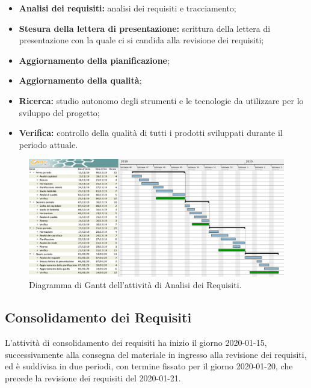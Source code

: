 				\begin{itemize}
					\item \textbf{Analisi dei requisiti:} analisi dei requisiti e tracciamento;
					\item \textbf{Stesura della lettera di presentazione:} scrittura della lettera di presentazione con la quale ci si candida alla revisione dei requisiti;
					\item \textbf{Aggiornamento della pianificazione};
					\item \textbf{Aggiornamento della qualità};
					\item \textbf{Ricerca:} studio autonomo degli strumenti e le tecnologie da utilizzare per lo sviluppo del progetto;
					\item \textbf{Verifica:} controllo della qualità di tutti i prodotti sviluppati durante il periodo attuale.
				\end{itemize}
        
        \begin{landscape}

          \begin{figure}[H]
            \centering
            \includegraphics[width=\linewidth]{images/ganttAnalisi}
            \caption{Diagramma di Gantt dell'attività di Analisi dei Requisiti.}
          \end{figure}

		\end{landscape}
		
		\subsection{Consolidamento dei Requisiti}
		
			L'attività di consolidamento dei requisiti ha inizio il giorno 2020-01-15, successivamente alla consegna del materiale in ingresso alla revisione dei requisiti, ed è suddivisa in due periodi, con termine fissato per il giorno 2020-01-20, che precede la revisione dei requisiti del 2020-01-21.
			
